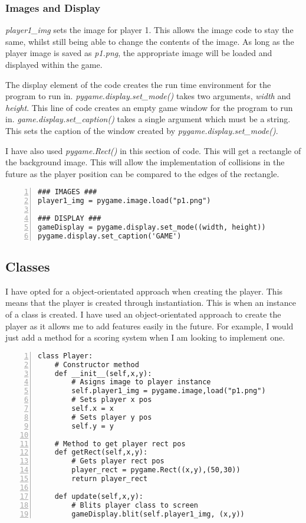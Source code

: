 \documentclass[12pt]{report}
\begin{document}
\pagebreak

\subsubsection{Images and Display}
\textit{player1\_img} sets the image for player 1. This allows the image code to stay the same, whilst still being able to change the contents of the image. As long as the player image is saved as \textit{p1.png}, the appropriate image will be loaded and displayed within the game.

The display element of the code creates the run time environment for the program to run in. \textit{pygame.display.set\_mode()} takes two arguments, \textit{width} and \textit{height}. This line of code creates an empty game window for the program to run in. \textit{game.display.set\_caption()} takes a single argument which must be a string. This sets the caption of the window created by \textit{pygame.display.set\_mode()}.

I have also used \textit{pygame.Rect()} in this section of code. This will get a rectangle of the background image. This will allow the implementation of collisions in the future as the player position can be compared to the edges of the rectangle. 

\begin{Verbatim}[numbers=left, frame=single]
### IMAGES ###
player1_img = pygame.image.load("p1.png")                           

### DISPLAY ###
gameDisplay = pygame.display.set_mode((width, height))  
pygame.display.set_caption('GAME')                      
\end{Verbatim}

\subsection{Classes}
I have opted for a object-orientated approach when creating the player. This means that the player is created through instantiation. This is when an instance of a class is created. I have used an object-orientated approach to create the player as it allows me to add features easily in the future. For example, I would just add a method for a scoring system when I am looking to implement one. 

\scriptsize

\begin{Verbatim}[numbers=left, frame=single]
class Player:
    # Constructor method
    def __init__(self,x,y):
        # Asigns image to player instance
        self.player1_img = pygame.image,load("p1.png")
        # Sets player x pos
        self.x = x
        # Sets player y pos
        self.y = y
        
    # Method to get player rect pos
    def getRect(self,x,y):
        # Gets player rect pos
        player_rect = pygame.Rect((x,y),(50,30))
        return player_rect
        
    def update(self,x,y):
        # Blits player class to screen
        gameDisplay.blit(self.player1_img, (x,y))
\end{Verbatim}
\end{document}
